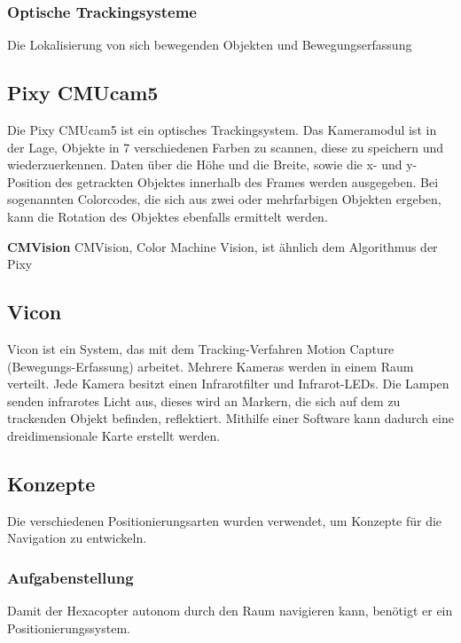     \subsubsection{Optische Trackingsysteme}

    Die Lokalisierung von sich bewegenden Objekten und Bewegungserfassung

    \subsection*{Pixy CMUcam5}
    Die Pixy CMUcam5 ist ein optisches Trackingsystem. Das Kameramodul ist in der Lage, Objekte in 7 verschiedenen Farben zu scannen, diese zu speichern und wiederzuerkennen. Daten über die Höhe und die Breite, sowie die x- und y-Position des getrackten Objektes innerhalb des Frames werden ausgegeben. Bei sogenannten Colorcodes, die sich aus zwei oder mehrfarbigen Objekten ergeben, kann die Rotation des Objektes ebenfalls ermittelt werden.

    \textbf{CMVision}
    CMVision, Color Machine Vision, ist ähnlich dem Algorithmus der Pixy

    \cite{Pixy}
    \cite{Pixy_Verfahren}
    \cite{Pixy_Verfahren2}

    \subsection*{Vicon}
    Vicon ist ein System, das mit dem Tracking-Verfahren Motion Capture (Bewegungs-Erfassung) arbeitet. 
    Mehrere Kameras werden in einem Raum verteilt. Jede Kamera besitzt einen Infrarotfilter und Infrarot-LEDs. Die Lampen senden infrarotes Licht aus, dieses wird an Markern, die sich auf dem zu trackenden Objekt befinden, reflektiert. Mithilfe einer Software kann dadurch eine dreidimensionale Karte erstellt werden.
    \cite{Vicon}

  \subsection{Konzepte}
  Die verschiedenen Positionierungsarten wurden verwendet, um Konzepte für die Navigation zu entwickeln.

    \subsubsection{Aufgabenstellung}
    Damit der Hexacopter autonom durch den Raum navigieren kann, benötigt er ein Positionierungssystem.

